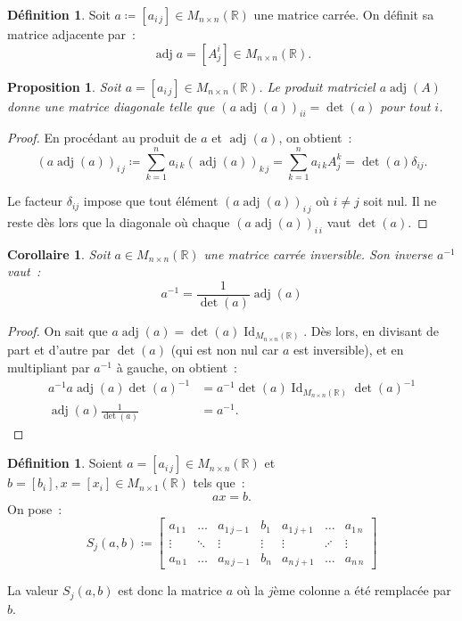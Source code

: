 \documentclass{article}
\DeclareMathOperator{\Id}{Id}
\DeclareMathOperator{\adj}{adj}
\newcommand{\R}{\mathbb R}
\newcommand{\M}[3]{M_{#1 \times #2}(#3)}
\newtheorem{prp}[thm]{Proposition}
\newtheorem{cor}[thm]{Corollaire}
\theoremstyle{definition}
\newtheorem{déf}[thm]{Définition}
\theoremstyle{remark}
\begin{document}
		\begin{déf} Soit $a \coloneqq [a_{i\,j}] \in \M nn\R$ une matrice carrée. On définit sa matrice adjacente par~: \[\adj a = [A_j^i] \in \M nn\R.\] \end{déf}

		\begin{prp} Soit $a = [a_{i\,j}] \in \M nn\R$. Le produit matriciel $a \adj(A)$ donne une matrice diagonale telle que $(a \adj(a))_{ii} = \det(a)$ pour tout $i$.
		\end{prp}

		\begin{proof} En procédant au produit de $a$ et $\adj(a)$, on obtient~:
		\[(a\adj(a))_{i\,j} \coloneqq \sum_{k=1}^na_{i\,k}(\adj(a))_{k\,j} = \sum_{k=1}^na_{i\,k}A_j^k = \det(a)\delta_{ij}.\]

		Le facteur $\delta_{ij}$ impose que tout élément $(a\adj(a))_{i\,j}$ où $i \neq j$ soit nul. Il ne reste dès lors que la diagonale où chaque $(a\adj(a))_{i\,i}$
		vaut $\det(a)$. \end{proof}

		\begin{cor} Soit $a \in \M nn\R$ une matrice carrée inversible. Son inverse $a^{-1}$ vaut~:
		\[a^{-1} = \frac 1{\det(a)}\adj(a)\] \end{cor}

		\begin{proof} On sait que $a\adj(a) = \det(a)\Id_{\M nn\R}$. Dès lors, en divisant de part et d'autre par $\det(a)$ (qui est non nul car $a$ est inversible),
		et en multipliant par $a^{-1}$ à gauche, on obtient~:
		\[\begin{aligned}
			a^{-1}a\adj(a)\det(a)^{-1} &= a^{-1}\det(a)\Id_{\M nn\R}\det(a)^{-1} \\
			\adj(a)\frac 1{\det(a)} &= a^{-1}.
		\end{aligned}\]
		\end{proof}

		\begin{déf} Soient $a = [a_{i\,j}] \in \M nn\R$ et $b = [b_i], x = [x_i] \in \M n1\R$ tels que~: \[ax = b.\] On pose~:
		\[S_j(a, b) \coloneqq
		\begin{bmatrix}
			a_{1\,1} & \ldots & a_{1\,j-1} &   b_1  & a_{1\,j+1} & \ldots  & a_{1\,n} \\
			  \vdots & \ddots &   \vdots   & \vdots &   \vdots   & \iddots &   \vdots \\
			a_{n\,1} & \ldots & a_{n\,j-1} &   b_n  & a_{n\,j+1} & \ldots  & a_{n\,n}
		\end{bmatrix}
		\]

		La valeur $S_j(a, b)$ est donc la matrice $a$ où la $j$ème colonne a été remplacée par $b$. \end{déf}
\end{document}
